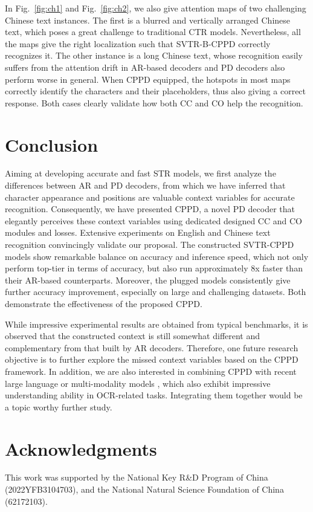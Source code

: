 \documentclass[10pt,journal,compsoc]{IEEEtran}
\begin{document}
In Fig.~\ref{fig:ch1} and Fig.~\ref{fig:ch2}, we also give attention maps of two challenging Chinese text instances. The first is a blurred and vertically arranged Chinese text, which poses a great challenge to traditional CTR models. Nevertheless, all the maps give the right localization such that SVTR-B-CPPD correctly recognizes it. The other instance is a long Chinese text, whose recognition easily suffers from the attention drift \cite{yue2020robustscanner} in AR-based decoders and PD decoders also perform worse in general. When CPPD equipped, the hotspots in most maps correctly identify the characters and their placeholders, thus also giving a correct response. Both cases clearly validate how both CC and CO help the recognition. 

\section{Conclusion}
Aiming at developing accurate and fast STR models, we first analyze the differences between AR and PD decoders, from which we have inferred that character appearance and positions are valuable context variables for accurate recognition. Consequently, we have presented CPPD, a novel PD decoder that elegantly perceives these context variables using dedicated designed CC and CO modules and losses. Extensive experiments on English and Chinese text recognition convincingly validate our proposal. The constructed SVTR-CPPD models show remarkable balance on accuracy and inference speed, which not only perform top-tier in terms of accuracy, but also run approximately 8x faster than their AR-based counterparts. Moreover, the plugged models consistently give further accuracy improvement, especially on large and challenging datasets. Both demonstrate the effectiveness of the proposed CPPD.

While impressive experimental results are obtained from typical benchmarks, it is observed that the constructed context is still somewhat different and complementary from that built by AR decoders. Therefore, one future research objective is to further explore the missed context variables based on the CPPD framework. In addition, we are also interested in combining CPPD with recent large language or multi-modality models \cite{awais2023foundational, radford2021learning}, which also exhibit impressive understanding ability in OCR-related tasks. Integrating them together would be a topic worthy further study.


\section*{Acknowledgments}
This work was supported by the National Key R\&D Program of China (2022YFB3104703), and the National Natural Science Foundation of China (62172103).






\newpage

\vfill
\end{document}
